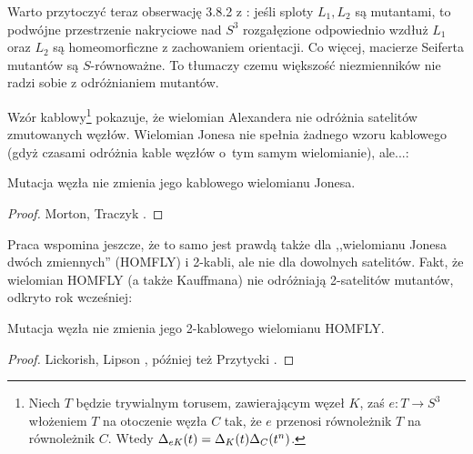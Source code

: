 Warto przytoczyć teraz obserwację 3.8.2 z \cite[s. 43]{kawauchi96}: jeśli sploty $L_1, L_2$ są mutantami, to podwójne przestrzenie nakryciowe nad $S^3$ rozgałęzione odpowiednio wzdłuż $L_1$ oraz $L_2$ są homeomorficzne z zachowaniem orientacji.
Co więcej, macierze Seiferta mutantów są $S$-równoważne.
%
To tłumaczy czemu większość niezmienników nie radzi sobie z odróżnianiem mutantów.

Wzór kablowy\footnote{Niech $T$ będzie trywialnym torusem, zawierającym węzeł $K$, zaś $e \colon T \to S^3$ włożeniem $T$ na otoczenie węzła $C$ tak, że $e$ przenosi równoleżnik $T$ na równoleżnik $C$. Wtedy $\Delta_{eK} (t) = \Delta_K(t)\Delta_C(t^n)$.} \cite[tw. 6.15]{lickorish97} pokazuje, że wielomian Alexandera nie odróżnia satelitów zmutowanych węzłów.
Wielomian Jonesa nie spełnia żadnego wzoru kablowego (gdyż czasami odróżnia kable węzłów o~tym samym wielomianie), ale...:

\begin{proposition}
    Mutacja węzła nie zmienia jego kablowego wielomianu Jonesa.
%
\end{proposition}

\begin{proof}
%
%
    Morton, Traczyk \cite{traczyk88}.
\end{proof}

Praca \cite{traczyk88} wspomina jeszcze, że to samo jest prawdą także dla ,,wielomianu Jonesa dwóch zmiennych'' (HOMFLY) i 2-kabli, ale nie dla dowolnych satelitów.
Fakt, że wielomian HOMFLY (a także Kauffmana) nie odróżniają 2-satelitów mutantów, odkryto rok wcześniej:

\begin{proposition}
\label{mutants_and_homfly}%
%
    Mutacja węzła nie zmienia jego 2-kablowego wielomianu HOMFLY.
\end{proposition}

\begin{proof}
%
%
%
    Lickorish, Lipson \cite{lipson87}, później też Przytycki \cite{przytycki89}.
\end{proof}


